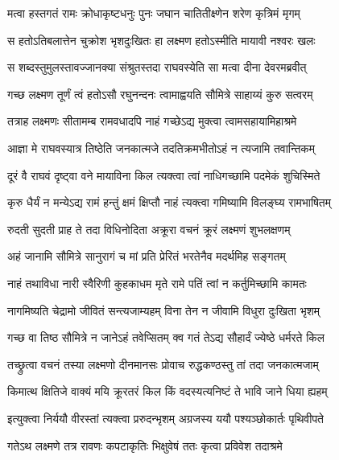 \twolineshloka
{मत्वा हस्तगतं रामः क्रोधाकृष्टधनुः पुनः}
{जघान चातितीक्ष्णेन शरेण कृत्रिमं मृगम्}%

\twolineshloka
{स हतोऽतिबलात्तेन चुक्रोश भृशदुःखितः}
{हा लक्ष्मण हतोऽस्मीति मायावी नश्वरः खलः}%

\twolineshloka
{स शब्दस्तुमुलस्तावज्जानक्या संश्रुतस्तदा}
{राघवस्येति सा मत्वा दीना देवरमब्रवीत्}%

\twolineshloka
{गच्छ लक्ष्मण तूर्णं त्वं हतोऽसौ रघुनन्दनः}
{त्वामाह्वयति सौ‌मित्रे साहाय्यं कुरु सत्वरम्}%

\twolineshloka
{तत्राह लक्ष्मणः सीतामम्ब रामवधादपि}
{नाहं गच्छेऽद्य मुक्त्वा त्वामसहायामिहाश्रमे}%

\twolineshloka
{आज्ञा मे राघवस्यात्र तिष्ठेति जनकात्मजे}
{तदतिक्रमभीतोऽहं न त्यजामि तवान्तिकम्}%

\twolineshloka
{दूरं वै राघवं दृष्ट्वा वने मायाविना किल}
{त्यक्त्वा त्वां नाधिगच्छामि पदमेकं शुचिस्मिते}%

\twolineshloka
{कृरु धैर्यं न मन्येऽद्य रामं हन्तुं क्षमं क्षिप्तौ}
{नाहं त्यक्त्वा गमिष्यामि विलङ्घ्य रामभाषितम्}%



\twolineshloka
{रुदती सुदती प्राह ते तदा विधिनोदिता}
{अक्रूरा वचनं क्रूरं लक्ष्मणं शुभलक्षणम्}%

\twolineshloka
{अहं जानामि सौ‌मित्रे सानुरागं च मां प्रति}
{प्रेरितं भरतेनैव मदर्थमिह सङ्गतम्}%

\twolineshloka
{नाहं तथाविधा नारी स्वैरिणी कुहकाधम}
{मृते रामे पतिं त्वां न कर्तुमिच्छामि कामतः}%

\twolineshloka
{नागमिष्यति चेद्रामो जीवितं सन्त्यजाम्यहम्}
{विना तेन न जीवामि विधुरा दुःखिता भृशम्}%

\twolineshloka
{गच्छ वा तिष्ठ सौ‍मित्रे न जानेऽहं तवेप्सितम्}
{क्व गतं तेऽद्य सौहार्दं ज्येष्ठे धर्मरते किल}%

\twolineshloka
{तच्छ्रुत्वा वचनं तस्या लक्ष्मणो दीनमानसः}
{प्रोवाच रुद्धकण्ठस्तु तां तदा जनकात्मजाम्}%

\twolineshloka
{किमात्थ क्षितिजे वाक्यं मयि क्रूरतरं किल}
{किं वदस्यत्यनिष्टं ते भावि जाने धिया ह्यहम्}%

\twolineshloka
{इत्युक्त्वा निर्ययौ वीरस्तां त्यक्त्वा प्ररुदन्भृशम्}
{अग्रजस्य ययौ पश्यञ्छोकार्तः पृथिवीपते}%

\twolineshloka
{गतेऽथ लक्ष्मणे तत्र रावणः कपटाकृतिः}
{भिक्षुवेषं ततः कृत्वा प्रविवेश तदाश्रमे}%

